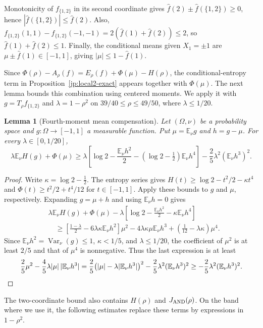 \documentclass[11pt,letterpaper]{amsart}
\newcommand{\E}{\mathbb E}
\newcommand{\1}{\mathbf 1}
\newtheorem{lemma}[theorem]{Lemma}
\numberwithin{equation}{section}
\begin{document}
Monotonicity of $f_{\{1,2\}}$ in its second coordinate gives
$\widehat f(2)\pm\widehat f(\{1,2\})\ge0$, hence
$|\widehat f(\{1,2\})|\le\widehat f(2)$.
Also,
$f_{\{1,2\}}(1,1)-f_{\{1,2\}}(-1,-1)
=2(\widehat f(1)+\widehat f(2))\le2$,
so $\widehat f(1)+\widehat f(2)\le1$.
Finally, the conditional means given $X_1=\pm1$ are
$\mu\pm\widehat f(1)\in[-1,1]$, giving
$|\mu|\le1-\widehat f(1)$.

Since $\Phi(\rho)-A_\rho(f)=E_\rho(f)+\Phi(\mu)-H(\rho)$,
the conditional-entropy term in Proposition~\ref{jp:local2-exact}
appears together with $\Phi(\mu)$.
The next lemma bounds this combination using centered moments.
We apply it with $g=T_\rho f_{\{1,2\}}$ and
$\lambda=1-\rho^2$ on $39/40\le\rho\le49/50$,
where $\lambda\le1/20$.

\begin{lemma}[Fourth-moment mean compensation]\label{lem:mean-moments}
Let $(\Omega,\nu)$ be a probability space and
$g:\Omega\to[-1,1]$ a measurable function.
Put $\mu=\E_\nu g$ and $h=g-\mu$.
For every $\lambda\in[0,1/20]$,
\[
 \lambda\E_\nu H(g)+\Phi(\mu)
 \ge\lambda\left[\log2-\frac{\E_\nu h^2}{2}
          -(\log2-\tfrac12)\E_\nu h^4\right]
       -\frac25\lambda^2(\E_\nu h^3)^2.
\]
\end{lemma}
\begin{proof}
Write $\kappa=\log2-\tfrac12$.
The entropy series gives
$H(t)\ge\log2-t^2/2-\kappa t^4$ and
$\Phi(t)\ge t^2/2+t^4/12$ for $t\in[-1,1]$.
Apply these bounds to $g$ and $\mu$, respectively.
Expanding $g=\mu+h$ and using $\E_\nu h=0$ gives
\[
 \begin{aligned}
 &\lambda\E_\nu H(g)+\Phi(\mu)
   -\lambda\left[\log2-\frac{\E_\nu h^2}{2}
                         -\kappa\E_\nu h^4\right]\\
 &\quad\ge
 \left[\frac{1-\lambda}{2}
       -6\lambda\kappa\E_\nu h^2\right]\mu^2
 -4\lambda\kappa\mu\E_\nu h^3
 +\left(\frac1{12}-\lambda\kappa\right)\mu^4.
 \end{aligned}
\]
Since $\E_\nu h^2=\operatorname{Var}_\nu(g)\le1$,
$\kappa<1/5$, and $\lambda\le1/20$,
the coefficient of $\mu^2$ is at least $2/5$
and that of $\mu^4$ is nonnegative.
Thus the last expression is at least
\[
 \frac25\mu^2-\frac45\lambda|\mu|\,|\E_\nu h^3|
 =\frac25\bigl(|\mu|-\lambda|\E_\nu h^3|\bigr)^2
   -\frac25\lambda^2(\E_\nu h^3)^2\ge-\frac25\lambda^2(\E_\nu h^3)^2. \qedhere
\]
\end{proof}

The two-coordinate bound also contains $H(\rho)$ and
$J_{\rm AND}(\rho)$. On the band where we use it, the following
estimates replace these terms by expressions in $1-\rho^2$.
\end{document}
